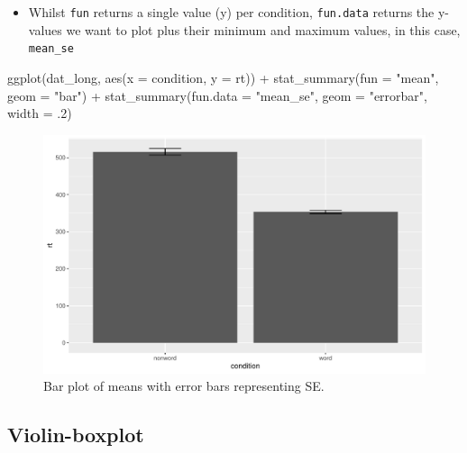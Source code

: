 \documentclass[
  english,
  doc,floatsintext]{apa6}
\newenvironment{Shaded}{\begin{snugshade}}{\end{snugshade}}
\newcommand{\AttributeTok}[1]{\textcolor[rgb]{0.77,0.63,0.00}{#1}}
\newcommand{\DecValTok}[1]{\textcolor[rgb]{0.00,0.00,0.81}{#1}}
\newcommand{\FunctionTok}[1]{\textcolor[rgb]{0.00,0.00,0.00}{#1}}
\newcommand{\NormalTok}[1]{#1}
\newcommand{\SpecialCharTok}[1]{\textcolor[rgb]{0.00,0.00,0.00}{#1}}
\newcommand{\StringTok}[1]{\textcolor[rgb]{0.31,0.60,0.02}{#1}}
\providecommand{\tightlist}{%
  \setlength{\itemsep}{0pt}\setlength{\parskip}{0pt}}
\begin{document}
\begin{itemize}
\tightlist
\item
  Whilst \texttt{fun} returns a single value (y) per condition, \texttt{fun.data} returns the y-values we want to plot plus their minimum and maximum values, in this case, \texttt{mean\_se}
\end{itemize}

\begin{Shaded}
\begin{Highlighting}[]
\FunctionTok{ggplot}\NormalTok{(dat\_long, }\FunctionTok{aes}\NormalTok{(}\AttributeTok{x =}\NormalTok{ condition, }\AttributeTok{y =}\NormalTok{ rt)) }\SpecialCharTok{+}
  \FunctionTok{stat\_summary}\NormalTok{(}\AttributeTok{fun =} \StringTok{"mean"}\NormalTok{, }\AttributeTok{geom =} \StringTok{"bar"}\NormalTok{) }\SpecialCharTok{+}
  \FunctionTok{stat\_summary}\NormalTok{(}\AttributeTok{fun.data =} \StringTok{"mean\_se"}\NormalTok{, }
               \AttributeTok{geom =} \StringTok{"errorbar"}\NormalTok{, }
               \AttributeTok{width =}\NormalTok{ .}\DecValTok{2}\NormalTok{)}
\end{Highlighting}
\end{Shaded}

\begin{figure}

{\centering \includegraphics[width=1\linewidth]{images/badbar2-1} 

}

\caption{Bar plot of means with error bars representing SE.}\label{fig:badbar2}
\end{figure}

\hypertarget{violin-boxplot}{%
\subsection{Violin-boxplot}\label{violin-boxplot}}
\end{document}
